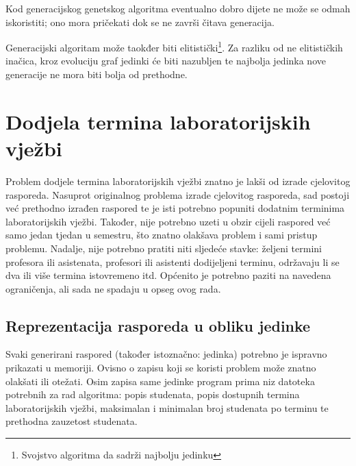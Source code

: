 \documentclass[times, utf8, zavrsni]{fer}
\begin{document}
\newpage

\begin{algorithm}
\begin{algorithmic}
\ENDWHILE
\end{algorithmic}
\end{algorithm}

Kod generacijskog genetskog algoritma eventualno dobro dijete ne može se odmah iskoristiti; ono mora pričekati dok se ne završi čitava generacija.

Generacijski algoritam može taokđer biti elitistički\footnote{Svojstvo algoritma da sadrži najbolju jedinku}. Za razliku od ne elitističkih inačica, kroz evoluciju graf jedinki će biti nazubljen te najbolja jedinka nove generacije ne mora biti bolja od prethodne. \citep{cupic-skripta}

\chapter{Dodjela termina laboratorijskih vježbi}
\label{ch:glavni}

Problem dodjele termina laboratorijskih vježbi znatno je lakši od izrade cjelovitog rasporeda. Nasuprot originalnog problema izrade cjelovitog rasporeda, sad postoji već prethodno izrađen raspored te je isti potrebno popuniti dodatnim terminima laboratorijskih vježbi. Također, nije potrebno uzeti u obzir cijeli raspored već samo jedan tjedan u semestru, što znatno olakšava problem i sami pristup problemu. Nadalje, nije potrebno pratiti niti sljedeće stavke: željeni termini profesora ili asistenata, profesori ili asistenti dodijeljeni terminu, održavaju li se dva ili više termina istovremeno itd. Općenito je potrebno paziti na navedena ograničenja, ali sada ne spadaju u opseg ovog rada.

\section{Reprezentacija rasporeda u obliku jedinke}

Svaki generirani raspored (također istoznačno: jedinka) potrebno je ispravno prikazati u memoriji. Ovisno o zapisu koji se koristi problem može znatno olakšati ili otežati. Osim zapisa same jedinke program prima niz datoteka potrebnih za rad algoritma: popis studenata, popis dostupnih termina laboratorijskih vježbi, maksimalan i minimalan broj studenata po terminu te prethodna zauzetost studenata.
\end{document}
